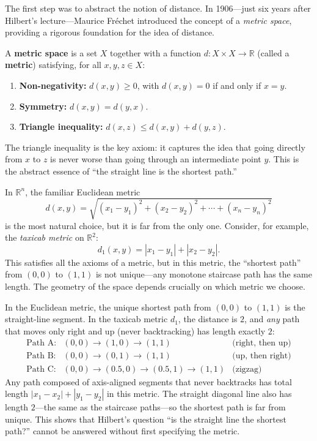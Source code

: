 The first step was to abstract the notion of distance. In 1906---just six years after Hilbert's lecture---Maurice Fr\'echet introduced the concept of a \emph{metric space}, providing a rigorous foundation for the idea of distance.

\begin{definition}
A \textbf{metric space} is a set $X$ together with a function $d : X \times X \to \mathbb{R}$ (called a \textbf{metric}) satisfying, for all $x, y, z \in X$:
\begin{enumerate}
    \item \textbf{Non-negativity:} $d(x,y) \geq 0$, with $d(x,y) = 0$ if and only if $x = y$.
    \item \textbf{Symmetry:} $d(x,y) = d(y,x)$.
    \item \textbf{Triangle inequality:} $d(x,z) \leq d(x,y) + d(y,z)$.
\end{enumerate}
\end{definition}

The triangle inequality is the key axiom: it captures the idea that going directly from $x$ to $z$ is never worse than going through an intermediate point $y$. This is the abstract essence of ``the straight line is the shortest path.''

In $\mathbb{R}^n$, the familiar Euclidean metric
\[
    d(x,y) = \sqrt{(x_1 - y_1)^2 + (x_2 - y_2)^2 + \cdots + (x_n - y_n)^2}
\]
is the most natural choice, but it is far from the only one. Consider, for example, the \emph{taxicab metric} on $\mathbb{R}^2$:
\[
    d_1(x,y) = |x_1 - y_1| + |x_2 - y_2|.
\]
This satisfies all the axioms of a metric, but in this metric, the ``shortest path'' from $(0,0)$ to $(1,1)$ is not unique---any monotone staircase path has the same length. The geometry of the space depends crucially on which metric we choose.

\begin{example}
In the Euclidean metric, the unique shortest path from $(0,0)$ to $(1,1)$ is the straight-line segment. In the taxicab metric $d_1$, the distance is $2$, and \emph{any} path that moves only right and up (never backtracking) has length exactly $2$:
\[
\begin{array}{lll}
\text{Path A:} & (0,0) \to (1,0) \to (1,1) & \text{(right, then up)} \\
\text{Path B:} & (0,0) \to (0,1) \to (1,1) & \text{(up, then right)} \\
\text{Path C:} & (0,0) \to (0.5,0) \to (0.5,1) \to (1,1) & \text{(zigzag)}
\end{array}
\]
Any path composed of axis-aligned segments that never backtracks has total length $|x_1-x_2|+|y_1-y_2|$ in this metric. The straight diagonal line also has length $2$---the same as the staircase paths---so the shortest path is far from unique. This shows that Hilbert's question ``is the straight line the shortest path?'' cannot be answered without first specifying the metric.
\end{example}

